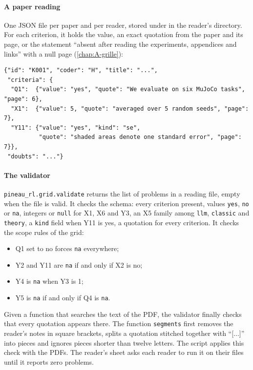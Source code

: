 \paragraph{A paper reading} One JSON file per paper and per reader, stored under
 in the reader's directory. For each criterion, it holds the value, an exact
quotation from the paper and its page, or the statement \enquote{absent after reading the
experiments, appendices and links} with a null page (\cref{chap:A-grille}):
\begin{lstlisting}
{"id": "K001", "coder": "H", "title": "...",
 "criteria": {
  "Q1":  {"value": "yes", "quote": "We evaluate on six MuJoCo tasks", "page": 6},
  "X1":  {"value": 5, "quote": "averaged over 5 random seeds", "page": 7},
  "Y11": {"value": "yes", "kind": "se",
          "quote": "shaded areas denote one standard error", "page": 7}},
 "doubts": "..."}
\end{lstlisting}

\paragraph{The validator} \texttt{pineau\_rl.grid.validate} returns the list of problems in a reading
file, empty when the file is valid. It checks the schema: every criterion present, values
\texttt{yes}, \texttt{no} or \texttt{na}, integers or \texttt{null} for X1, X6 and Y3, an X5 family
among \texttt{llm}, \texttt{classic} and \texttt{theory}, a \texttt{kind} field when Y11 is yes, a
quotation for every criterion. It checks the scope rules of the grid:
\begin{itemize}
  \item Q1 set to no forces \texttt{na} everywhere;
  \item Y2 and Y11 are \texttt{na} if and only if X2 is no;
  \item Y4 is \texttt{na} when Y3 is 1;
  \item Y5 is \texttt{na} if and only if Q4 is \texttt{na}.
\end{itemize}
Given a function that searches the text of the PDF, the validator finally checks that every
quotation appears there. The function
\texttt{segments} first removes the reader's notes in square brackets, splits a quotation stitched
together with \enquote{[...]} into pieces and ignores pieces shorter than twelve letters. The script
 applies this check with the PDFs. The reader's sheet asks each reader to
run it on their files until it reports zero problems.

